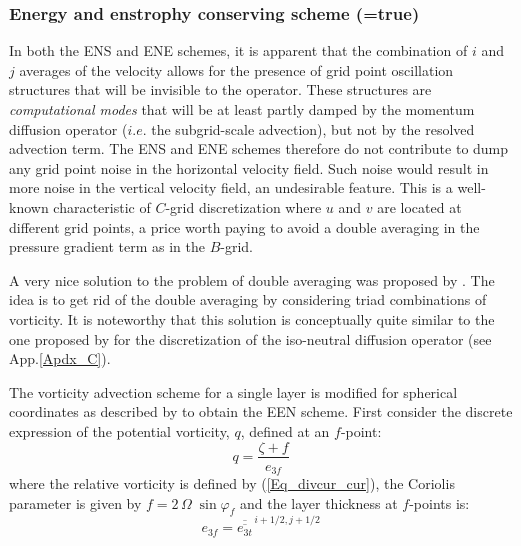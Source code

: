 \documentclass[NEMO_book]{subfiles}
\begin{document}
\subsubsection{Energy and enstrophy conserving scheme (=true) }
\label{DYN_vor_een}

In both the ENS and ENE schemes, it is apparent that the combination of $i$ and $j$ 
averages of the velocity allows for the presence of grid point oscillation structures 
that will be invisible to the operator. These structures are \textit{computational modes} 
that will be at least partly damped by the momentum diffusion operator ($i.e.$ the 
subgrid-scale advection), but not by the resolved advection term. The ENS and ENE schemes
therefore do not contribute to dump any grid point noise in the horizontal velocity field.
Such noise would result in more noise in the vertical velocity field, an undesirable feature. 
This is a well-known characteristic of $C$-grid discretization where $u$ and $v$ are located 
at different grid points, a price worth paying to avoid a double averaging in the pressure 
gradient term as in the $B$-grid. 

A very nice solution to the problem of double averaging was proposed by \citet{Arakawa_Hsu_MWR90}. 
The idea is to get rid of the double averaging by considering triad combinations of vorticity. 
It is noteworthy that this solution is conceptually quite similar to the one proposed by
\citep{Griffies_al_JPO98} for the discretization of the iso-neutral diffusion operator (see App.\ref{Apdx_C}).

The \citet{Arakawa_Hsu_MWR90} vorticity advection scheme for a single layer is modified 
for spherical coordinates as described by \citet{Arakawa_Lamb_MWR81} to obtain the EEN scheme. 
First consider the discrete expression of the potential vorticity, $q$, defined at an $f$-point: 
\begin{equation} \label{Eq_pot_vor}
q  = \frac{\zeta +f} {e_{3f} }
\end{equation}
where the relative vorticity is defined by (\ref{Eq_divcur_cur}), the Coriolis parameter 
is given by $f=2 \,\Omega \;\sin \varphi _f $ and the layer thickness at $f$-points is: 
\begin{equation} \label{Eq_een_e3f}
e_{3f} = \overline{\overline {e_{3t} }} ^{\,i+1/2,j+1/2}
\end{equation}
\end{document}
